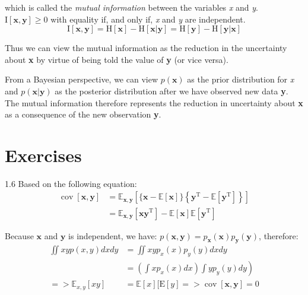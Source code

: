 \documentclass[5p,sort&compress]{elsarticle}
\begin{document}
which is called the \textit{mutual information} between the variables \textit{x} and \textit{y}. $\mathrm{I}[\mathbf{x}, \mathbf{y}] \geq 0$ with equality if, and only if, \textit{x} and \textit{y} are independent.
\begin{equation}
\mathrm{I}[\mathbf{x}, \mathbf{y}]=\mathrm{H}[\mathbf{x}]-\mathrm{H}[\mathbf{x} | \mathbf{y}]=\mathrm{H}[\mathbf{y}]-\mathrm{H}[\mathbf{y} | \mathbf{x}]
\end{equation}

Thus we can view the mutual information as the reduction in the uncertainty about \textbf{x} by virtue of being told the value of \textbf{y} (or vice versa). 

From a Bayesian perspective, we can view $p(\mathbf{x})$ as the prior distribution for \textit{x} and $p(\mathbf{x} | \mathbf{y})$ as the posterior distribution after we have observed new data \textbf{y}. The mutual information therefore represents the reduction in uncertainty about \textbf{x} as a consequence of the new observation \textbf{y}.

\section{Exercises}

1.6 Based on the following equation:
\begin{equation}
\begin{aligned} \operatorname{cov}[\mathbf{x}, \mathbf{y}] &=\mathbb{E}_{\mathbf{x}, \mathbf{y}}\left[\{\mathbf{x}-\mathbb{E}[\mathbf{x}]\}\left\{\mathbf{y}^{\mathrm{T}}-\mathbb{E}\left[\mathbf{y}^{\mathrm{T}}\right]\right\}\right] \\ &=\mathbb{E}_{\mathbf{x}, \mathbf{y}}\left[\mathbf{x} \mathbf{y}^{\mathrm{T}}\right]-\mathbb{E}[\mathbf{x}] \mathbb{E}\left[\mathbf{y}^{\mathrm{T}}\right] \end{aligned}
\end{equation}

Because $\mathbf{x}$ and $\mathbf{y}$ is independent, we have:
$p(\mathbf{x}, \mathbf{y}) = p_{\mathbf{x}}(\mathbf{x})p_{\mathbf{y}}(\mathbf{y})$, therefore:
\begin{equation}
\begin{aligned} \iint x y p(x, y) d x d y &=\iint x y p_{x}(x) p_{y}(y) d x d y \\ &\left.=\left(\int x p_{x}(x) d x\right) \int y p_{y}(y) d y\right) \\=>\mathbb{E}_{x, y}[x y] &=\mathbb{E}[x][\mathrm{E}[y] => \operatorname{cov}[\mathbf{x}, \mathbf{y}] =0\end{aligned}
\end{equation}
\end{document}
